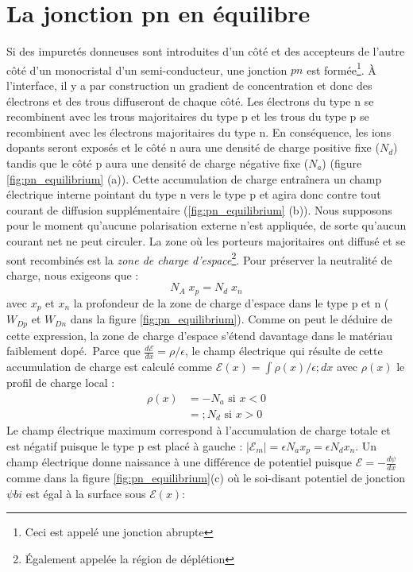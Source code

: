\section{La jonction pn en équilibre}
Si des impuretés donneuses sont introduites d'un côté et des accepteurs de l'autre côté d'un monocristal d'un semi-conducteur, une jonction $pn$ est formée\footnote{Ceci est appelé une jonction abrupte}. À l'interface, il y a par construction un gradient de concentration et donc des électrons et des trous diffuseront de chaque côté. Les électrons du type n se recombinent avec les trous majoritaires du type p et les trous du type p se recombinent avec les électrons majoritaires du type n. En conséquence, les ions dopants seront exposés et le côté n aura une densité de charge positive fixe ($N_d$) tandis que le côté p aura une densité de charge négative fixe ($N_a$) (figure \ref{fig:pn_equilibrium} (a)). Cette accumulation de charge entraînera un champ électrique interne pointant du type n vers le type p et agira donc contre tout courant de diffusion supplémentaire (\ref{fig:pn_equilibrium} (b)). Nous supposons pour le moment qu'aucune polarisation externe n'est appliquée, de sorte qu'aucun courant net ne peut circuler. La zone où les porteurs majoritaires ont diffusé et se sont recombinés est la \emph{zone de charge d'espace}\footnote{Également appelée la région de déplétion}. Pour préserver la neutralité de charge, nous exigeons que :
$$
N_A \; x_p = N_d \; x_n
$$
avec $x_p$ et $x_n$ la profondeur de la zone de charge d'espace dans le type p et n ($W_{Dp}$ et $W_{Dn}$ dans la figure \ref{fig:pn_equilibrium}). Comme on peut le déduire de cette expression, la zone de charge d'espace s'étend davantage dans le matériau faiblement dopé.\
Parce que $\frac{d\mathcal{E}}{dx} = \rho/\epsilon$, le champ électrique qui résulte de cette accumulation de charge est calculé comme $\mathcal{E}(x) = \int \rho(x)/\epsilon ; dx$ avec $\rho(x)$ le profil de charge local :
\begin{equation}
	\begin{split}
		\rho(x) &= -N_a \text{ si } x < 0 \\
		&= ; N_d \text{ si } x > 0
	\end{split}
\end{equation}
Le champ électrique maximum correspond à l'accumulation de charge totale et est négatif puisque le type p est placé à gauche : $|\mathcal{E}_m| = \epsilon N_a x_p = \epsilon N_d x_n$. Un champ électrique donne naissance à une différence de potentiel puisque $\mathcal{E} = -\frac{d\psi}{dx}$ comme dans la figure \ref{fig:pn_equilibrium}(c) où le soi-disant potentiel de jonction $\psi{bi}$ est égal à la surface sous $\mathcal{E}(x)$:
